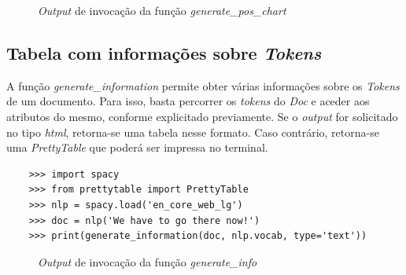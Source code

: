\documentclass[12pt]{article}
\begin{document}
\begin{figure}[!ht]
	\centering
	\setlength{\abovecaptionskip}{-.8cm}
	\caption{\textit{Output} de invocação da função \textit{generate\_pos\_chart}}
	\label{figure:pos-frequence}
\end{figure}

\subsection{Tabela com informações sobre \textit{Tokens}}

A função \textit{generate\_information} permite obter várias informações sobre os \textit{Tokens} de um documento. Para isso, basta percorrer os \textit{tokens} do \textit{Doc} e aceder aos atributos do mesmo, conforme explicitado previamente. Se o \textit{output} for solicitado no tipo \textit{html}, retorna-se uma tabela nesse formato. Caso contrário, retorna-se uma \textit{PrettyTable} que poderá ser impressa no terminal.

\begin{verbatim}
	>>> import spacy
	>>> from prettytable import PrettyTable
	>>> nlp = spacy.load('en_core_web_lg')
	>>> doc = nlp('We have to go there now!')
	>>> print(generate_information(doc, nlp.vocab, type='text'))
\end{verbatim}

\begin{figure}[!ht]
	\centering
	\setlength{\abovecaptionskip}{-.5cm}
	\caption{\textit{Output} de invocação da função \textit{generate\_info}}
	\label{figure:table-info}
\end{figure}
\end{document}
